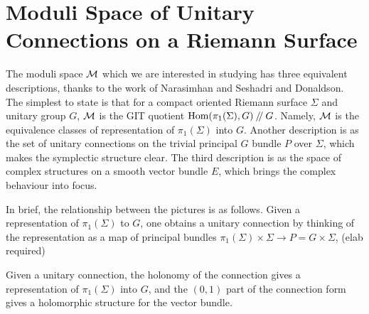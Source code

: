 \section{Moduli Space of Unitary Connections on a Riemann Surface}
\label{s:vectorbundles}
	The moduli space $\mathcal{M}$ which we are interested in studying has three equivalent descriptions, thanks to the work of Narasimhan and Seshadri and Donaldson. The simplest to state is that for a compact oriented Riemann surface $\Sigma$ and unitary group $G$, $\mathcal{M}$ is the GIT quotient $\text{Hom}(\pi_1(\Sigma), G)\mathbin{/\mkern-4mu/} G$. Namely, $\mathcal{M}$ is the equivalence classes of representation of $\pi_1(\Sigma)$ into $G$. Another description is as the set of unitary connections on the trivial principal $G$ bundle $P$ over $\Sigma$, which makes the symplectic structure clear. The third description is as the space of complex structures on a smooth vector bundle $E$, which brings the complex behaviour into focus.
	
	In brief, the relationship between the pictures is as follows. Given a representation of $\pi_1(\Sigma)$ to $G$, one obtains a unitary connection by thinking of the representation as a map of principal bundles $\pi_1(\Sigma)\times \Sigma \to P = G\times \Sigma$, (elab required)
	
	Given a unitary connection, the holonomy of the connection gives a representation of $\pi_1(\Sigma)$ into $G$, and the $(0,1)$ part of the connection form gives a holomorphic structure for the vector bundle. 
